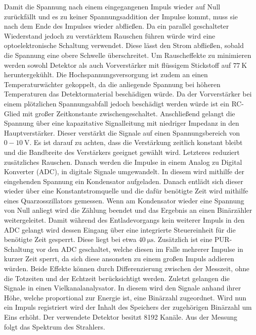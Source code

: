 Damit die Spannung nach einem eingegangenen Impuls wieder auf Null zurückfällt und es zu keiner Spannungsaddition der Impulse kommt, muss sie nach dem Ende des Impulses wieder abfließen. Da ein parallel geschalteter Wiederstand jedoch zu verstärktem Rauschen führen würde wird eine optoelektronische Schaltung verwendet. Diese lässt den Strom abfließen, sobald die Spannung eine obere Schwelle überschreitet. Um Rauscheffekte zu minimieren werden sowohl Detektor als auch Vorverstärker mit flüssigem Stickstoff auf $\SI{77}{\kelvin}$ heruntergekühlt. Die Hochspannungsversorgung ist zudem an einen Temperaturwächter gekoppelt, da die anliegende Spannung bei höheren Temperaturen das Detektormaterial beschädigen würde. Da der Vorverstärker bei einem plötzlichen Spannungsabfall jedoch beschädigt werden würde ist ein RC-Glied mit großer Zeitkonstante zwischengeschaltet. Anschließend gelangt die Spannung über eine kapazitative Signalleitung mit niedriger Impedanz in den Hauptverstärker. Dieser verstärkt die Signale auf einen Spannungsbereich von $0 - \SI{10}{\volt}$. Es ist darauf zu achten, dass die Verstärkung zeitlich konstant bleibt und die Bandbreite des Verstärkers geeignet gewählt wird. Letzteres reduziert zusätzliches Rauschen. Danach werden die Impulse in einem Analog zu Digital Konverter (ADC), in digitale Signale umgewandelt. In diesem wird mithilfe der eingehenden Spannung ein Kondensator aufgeladen. Danach entlädt sich dieser wieder über eine Konstantstromquelle und die dafür benötigte Zeit wird mithilfe eines Quarzosszillators gemessen. Wenn am Kondensator wieder eine Spannung von Null anliegt wird die Zählung beendet und das Ergebnis an einen Binärzähler weitergeleitet. Damit während des Entladevorgangs kein weiterer Impuls in den ADC gelangt wird dessen Eingang über eine integrierte Steuereinheit für die benötigte Zeit gesperrt. Diese liegt bei etwa $\SI{40}{\micro\second}$. Zusätzlich ist eine PUR-Schaltung vor den ADC geschaltet, welche diesen im Falle mehrerer Impulse in kurzer Zeit sperrt, da sich diese ansonsten zu einem großen Impuls addieren würden. Beide Effekte können durch Differenzierung zwischen der Messzeit, ohne die Totzeiten und der Echtzeit berücksichtigt werden. Zuletzt gelangen die Signale in einen Vielkanalanalysator. In diesem wird den Signale anhand ihrer Höhe, welche proportional zur Energie ist, eine Binärzahl zugeordnet. Wird nun ein Impuls registriert wird der Inhalt des Speichers der zugehörigen Binärzahl um Eins erhöht. Der verwendete Detektor besitzt 8192 Kanäle. Aus der Messung folgt das Spektrum des Strahlers.